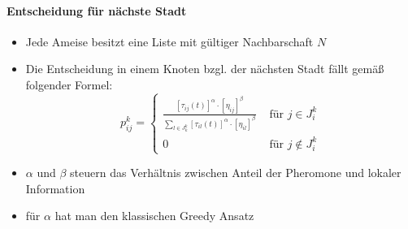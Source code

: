 \paragraph{Entscheidung für nächste Stadt}
\begin{itemize}
	\item Jede Ameise besitzt eine Liste mit gültiger Nachbarschaft $N$
	\item Die Entscheidung in einem Knoten bzgl. der nächsten Stadt fällt gemäß
		folgender Formel:
		$$
			p_{i j}^k=\left\{
				\begin{array}{ll}
					\frac {
							\left[\tau_{i j}(t)\right]^\alpha \cdot
							\left[\eta_{i j}\right]^\beta
						} {
							\sum_{l \in J_k^k}
							\left[\tau_{i l}(t)\right]^\alpha \cdot
							\left[\eta_{i l}\right]^\beta
						} & \text{ für } j \in J_i^k \\
					0 & \text{ für } j \notin J_i^k
				\end{array}
			\right.
		$$
	\item $\alpha$ und $\beta$ steuern das Verhältnis zwischen Anteil der
		Pheromone und lokaler Information
	\item für $\alpha$ hat man den klassischen Greedy Ansatz
\end{itemize}
